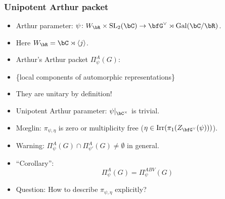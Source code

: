 \documentclass[t,mathserif,11pt,handout,usenames,dvipsnames]{beamer}
\theoremstyle{plain}
\theoremstyle{definition}
\def\Gal{\mathrm{Gal}}
\def\SL{{\mathrm{SL}}}
\def\Irr{{\mathrm{Irr}}}
\def\red{\color{red}}
\def\lblue{\color{blue}}
\begin{document}
\begin{frame}[label=DU]
  \frametitle{Unipotent Arthur packet}

  \begin{itemize}[<+->]
  \item {\lblue Arthur parameter:}
    $\psi\colon W_\bR\times \SL_2(\bC)\rightarrow \bfG^\vee \rtimes \Gal(\bC/\bR)$.
    
  \item[]\hspace{4em} Here $W_\bR = \bC\rtimes \langle j\rangle $.
  \item Arthur's Arthur packet $\Pi_{\psi}^{A}(G)$:
  \item[] \hspace{2em} \{local components of automorphic
    representations\}
  \item[] {\red They are unitary by definition!}
  \item {\lblue Unipotent Arthur parameter}: $\psi|_{\bC^\times}$ is trivial.
  \item[]  M\oe glin: $\pi_{\psi, \eta}$ is zero or multiplicity free ($\eta\in\Irr(\pi_1(Z_{\bfG^\vee}(\psi)))$). 
  \item[] {\lblue Warning:} {\red  $\Pi_{\psi}^A(G) \cap
      \Pi^A_{\psi'}(G)\neq \emptyset$ } in general.
  \item {\lblue ``Corollary'':}
    \[
      \Pi_{\psi}^{A}(G) = \Pi_{\psi}^{ABV}(G) 
    \]
  \item {\lblue Question:} How to  describe $\pi_{\psi,\eta}$ explicitly?  
  \end{itemize}
\end{frame}



\begin{frame}
\vfill
\vfill
\end{frame}
\end{document}
